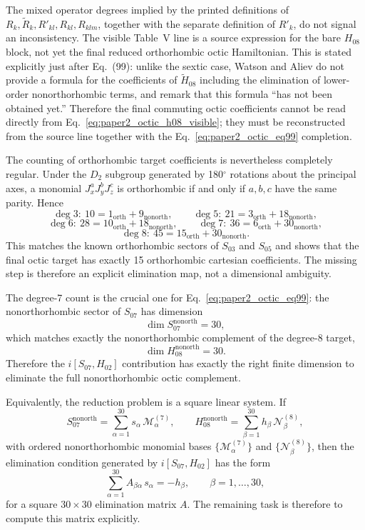 \documentclass[aip,jcp,reprint,floatfix]{revtex4-2}
\begin{document}
The mixed operator degrees implied by the printed definitions of
\(R_k,\widetilde R_k,R'_{kl},R_{kl},R_{klm}\), together with the separate
definition of \(R'_k\), do not signal an inconsistency.  The
visible Table~V line is a source expression for the bare \(H_{08}\) block, not
yet the final reduced orthorhombic octic Hamiltonian.  This is stated
explicitly just after Eq.~(99): unlike the sextic case, Watson and Aliev do
not provide a formula for the coefficients of \(\tilde H_{08}\) including the
elimination of lower-order nonorthorhombic terms, and remark that this
formula ``has not been obtained yet.''  Therefore the final commuting octic
coefficients cannot be read directly from Eq.~\eqref{eq:paper2_octic_h08_visible};
they must be reconstructed from the source line together with the
Eq.~\eqref{eq:paper2_octic_eq99} completion.

The counting of orthorhombic target coefficients is nevertheless completely
regular. Under the \(D_2\) subgroup generated by 180\(^{\circ}\) rotations about
the principal axes, a monomial \(J_x^aJ_y^bJ_z^c\) is orthorhombic if and only
if \(a,b,c\) have the same parity. Hence
\[
\deg 3:\ 10=1_{\mathrm{orth}}+9_{\mathrm{nonorth}},\qquad
\deg 5:\ 21=3_{\mathrm{orth}}+18_{\mathrm{nonorth}},
\]
\[
\deg 6:\ 28=10_{\mathrm{orth}}+18_{\mathrm{nonorth}},\qquad
\deg 7:\ 36=6_{\mathrm{orth}}+30_{\mathrm{nonorth}},
\]
\[
\deg 8:\ 45=15_{\mathrm{orth}}+30_{\mathrm{nonorth}}.
\]
This matches the known orthorhombic sectors of \(S_{03}\) and \(S_{05}\) and
shows that the final octic target has exactly 15 orthorhombic cartesian
coefficients. The missing step is therefore an explicit elimination map, not a
dimensional ambiguity.

The degree-7 count is the crucial one for Eq.~\eqref{eq:paper2_octic_eq99}:
the nonorthorhombic sector of \(S_{07}\) has dimension
\[
\dim S_{07}^{\mathrm{nonorth}} = 30,
\]
which matches exactly the nonorthorhombic complement of the degree-8 target,
\[
\dim H_{08}^{\mathrm{nonorth}} = 30.
\]
Therefore the \(i[S_{07},H_{02}]\) contribution has exactly the right finite
dimension to eliminate the full nonorthorhombic octic complement.

Equivalently, the reduction problem is a square linear system. If
\[
S_{07}^{\mathrm{nonorth}}=\sum_{\alpha=1}^{30} s_\alpha\,\mathcal M_\alpha^{(7)},
\qquad
H_{08}^{\mathrm{nonorth}}=\sum_{\beta=1}^{30} h_\beta\,\mathcal N_\beta^{(8)},
\]
with ordered nonorthorhombic monomial bases
\(\{\mathcal M_\alpha^{(7)}\}\) and \(\{\mathcal N_\beta^{(8)}\}\), then the
elimination condition generated by \(i[S_{07},H_{02}]\) has the form
\[
\sum_{\alpha=1}^{30} A_{\beta\alpha}\,s_\alpha = -h_\beta,
\qquad \beta=1,\dots,30,
\]
for a square \(30\times 30\) elimination matrix \(A\). The remaining task is
therefore to compute this matrix explicitly.
\end{document}
